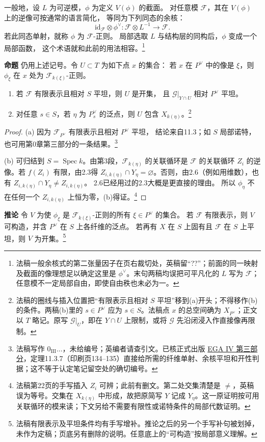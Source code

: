 \documentclass[openany,fontset=fandol]{ctexbook}
\DeclareMathOperator{\Spec}{Spec}
\newcommand{\FF}{\mathcal F}
\newcommand{\GG}{\mathcal G}
\newcommand{\id}{\mathrm{id}}
\newcommand{\tagitem}[2]{\par\medskip\noindent\textbf{#1\quad #2}\enspace}
\begin{document}
一般地，设 $L$ 为可逆模，$\phi$ 为定义 $V(\phi)$ 的截面。
对任意模 $\FF$，其在 $V(\phi)$ 上的逆像可按通常的语言简化，
等同为下列同态的余核：
\[
 \id_{\FF}\otimes\phi^\vee:\FF\otimes L^{-1}\longrightarrow\FF .
\]
若此同态单射，就称 $\phi$ 为 $\FF$-正则。
局部选取 $L$ 与结构层的同构后，$\phi$ 变成一个局部函数，
这个术语就和此前的用法相容。\footnote{法稿一般余核式的第二张量因子在页右裁切处，英稿留“??”；前面的同一映射及截面的像理想足以确定这里是 $\phi^\vee$。末句两稿均误把可平凡化的 $L$ 写为 $\FF$；任意模不一定局部自由，即使自由秩也未必为一。}

\tagitem{命题}{5.3}
仍用上述记号。令 $U\subset T$ 为如下点 $x$ 的集合：
若 $x$ 在 $P^\vee$ 中的像是 $\xi$，则 $\phi_\xi$ 在 $x$ 处为 $\FF_{k(\xi)}$-正则。
\begin{enumerate}
\item[(a)] 若 $\FF$ 有限表示且相对 $S$ 平坦，则 $U$ 是开集，
且 $\GG|_{Y\cap U}$ 相对 $P^\vee$ 平坦。
\item[(b)] 对任意 $s\in S$，若 $\eta$ 为 $P^\vee_s$ 的泛点，则 $U$ 包含 $X_{k(\eta)}$。\footnote{法稿的圈线与插入位置把“有限表示且相对 $S$ 平坦”移到(a)开头；不得移作(b)的条件。两稿(b)里的 $s\in P^\vee$ 应为 $s\in S$。法稿点 $x$ 的总空间确为 $X_{P^\vee}$；正文以 $T$ 略记。原写 $\GG|_U$，即在 $Y\cap U$ 上限制，或将 $\GG$ 先沿闭浸入作直接像再限制。}
\end{enumerate}
\begin{proof}
(a) 因为 $\FF_{P^\vee}$ 有限表示且相对 $P^\vee$ 平坦，
结论来自11.3；如 $S$ 局部诺特，也可用第0章第三部分的一条结果。\footnote{法稿写作 $0_{\mathrm{III}}\ldots$，未给编号；英编者请查引文。已核正式出版 \href{https://webusers.imj-prg.fr/~leila.schneps/grothendieckcircle/EGA/EGAIV.3.pdf}{EGA IV 第三部分}，定理11.3.7（印刷页134--135）直接给所需的纤维单射、余核平坦和开性判据；这不等于认定笔记留空处的确切编号。}

(b) 可归结到 $S=\Spec k$。由第3段，$\FF_{k(\eta)}$ 的关联循环是
$\FF$ 的关联循环 $Z_i$ 的逆像。若 $f(Z_i)$ 有限，由2.3得
$Z_{i,k(\eta)}\cap Y_\eta=\varnothing$。否则，由2.6（例如用维数），也有
$Z_{i,k(\eta)}\cap Y_\eta\ne Z_{i,k(\eta)}$。
2.6已经用过的2.3大概是更直接的理由。
所以 $\phi_\eta$ 不在任何一个 $Z_{i,k(\eta)}$ 上恒为零，(b)得证。\footnote{法稿第22页的手写插入 $Z_i$ 可辨；此前有删文。第二处交集清楚是 $\ne$，英稿误为等号。交集在 $X_{k(\eta)}$ 中形成，故把原简写 $Y$ 记成 $Y_\eta$。这一原证明按可用关联循环的模来读；下文另给不需要有限性或诺特条件的局部代数证明。}
\end{proof}

\tagitem{推论}{5.4}
令 $V$ 为使 $\phi_\xi$ 是 $\FF_{k(\xi)}$-正则的所有 $\xi\in P^\vee$ 的集合。
若 $\FF$ 有限表示，则 $V$ 可构造，并含 $P^\vee$ 在 $S$ 上各纤维的泛点。
若再有 $X$ 在 $S$ 上固有且 $\FF$ 在 $S$ 上平坦，则 $V$ 为开集。\footnote{法稿有限表示及平坦条件均有手写增补。推论之后的另一个手写补句被划掉，未作为定稿；页底另有删除的说明。任意底上的“可构造”按局部意义理解。}
\end{document}
